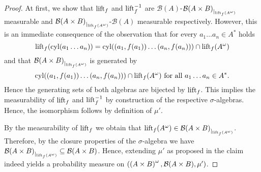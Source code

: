 \begin{proof}
  At first, we show that $\operatorname{lift}_{f}$ and $\operatorname{lift}_{f}^{-1}$ are 
  $\mathcal{B}(A)$-${\mathcal{B}(A\times B)}_{|_{\operatorname{lift}_{f}(A^{\omega})}}$
  measurable and
  ${\mathcal{B}(A\times B)}_{|_{\operatorname{lift}_{f}(A^{\omega})}}$-$\mathcal{B}(A)$
  measurable respectively. However, this is an immediate consequence of the
  observation that for every $a_{1}\dots a_{n}\in A^{*}$ holds
  \begin{equation*}
    \operatorname{lift}_{f}(\operatorname{cyl}(a_{1}\dots a_{n})) = 
      \operatorname{cyl}(\left(a_{1}, f(a_{1})\right)\dots\left(a_{n}, f(a_{n})\right))\cap
        \operatorname{lift}_{f}(A^{\omega})
  \end{equation*}
  and that ${\mathcal{B}(A\times B)}_{|_{\operatorname{lift}_{f}(A^{\omega})}}$ is
  generated by
  \begin{equation*}
    \operatorname{cyl}(\left(a_{1}, f(a_{1})\right)\dots\left(a_{n}, f(a_{n})\right))\cap
      \operatorname{lift}_{f}(A^{\omega})\text{ for all }a_{1}\dots a_{n}\in A^{*}.
  \end{equation*}
  Hence the generating sets of both algebras are bijected by $\operatorname{lift}_{f}$. This
  implies the measurability of $\operatorname{lift}_{f}$ and $\operatorname{lift}_{f}^{-1}$ by construction
  of the respective $\sigma$-algebras. Hence, the isomorphism follows by
  definition of $\mu'$.

  By the measurability of $\operatorname{lift}_{f}$ we obtain that $\operatorname{lift}_{f}(A^{\omega})\in
  {\mathcal{B}(A\times B)}_{|_{\operatorname{lift}_{f}(A^{\omega})}}$. Therefore, by
  the closure properties of the $\sigma$-algebra we have ${
  \mathcal{B}(A\times B)}_{|_{\operatorname{lift}_{f}(A^{\omega})}}
  \subseteq\mathcal{B}(A\times B)$. Hence, extending $\mu'$ as proposed in the
  claim indeed yields a probability measure on 
  $\left(\left(A\times B\right)^{\omega}, \mathcal{B}(A\times B), \mu'\right)$.
\end{proof}
